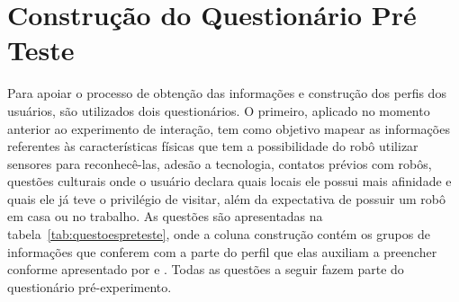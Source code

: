 \section{Construção do Questionário Pré Teste}
\label{sec:questionariopreteste}
Para apoiar o processo de obtenção das informações e construção dos perfis dos usuários, são utilizados dois questionários. O primeiro, aplicado no momento anterior ao experimento de interação, tem como objetivo mapear as informações referentes às características físicas que tem a possibilidade do robô utilizar sensores para reconhecê-las, adesão a tecnologia, contatos prévios com robôs, questões culturais onde o usuário declara quais locais ele possui mais afinidade e quais ele já teve o privilégio de visitar, além da expectativa de possuir um robô em casa ou no trabalho. As questões são apresentadas na tabela~\ref{tab:questoespreteste}, onde a coluna construção contém os grupos de informações que conferem com a parte do perfil que elas auxiliam a preencher conforme apresentado por \textcite{barbosa:2010} e \textcite{baxter:2015}. Todas as questões a seguir fazem parte do questionário pré-experimento.

